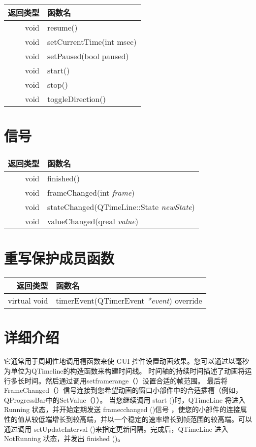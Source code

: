 \begin{tabular}{|r|l|}
	\hline
	返回类型 &	函数名 \\ 
	\hline
	void  &	resume() \\ 
	\hline
	void &	setCurrentTime(int msec) \\ 
	\hline
	void &	setPaused(bool paused) \\ 
	\hline
	void 	&start() \\ 
	\hline
	void &	stop() \\ 
	\hline
	void &	toggleDirection() \\ 
	\hline
\end{tabular}




\section{信号}

\begin{tabular}{|r|l|}
	\hline
	返回类型 &	函数名 \\ 
	\hline
	void  &	finished() \\ 
	\hline
	void 	&frameChanged(int \emph{frame}) \\ 
	\hline
	void 	&stateChanged(QTimeLine::State \emph{newState}) \\ 
	\hline 
	void 	&valueChanged(qreal \emph{value}) \\
	\hline
\end{tabular}

\section{重写保护成员函数}

\begin{tabular}{|r|l|}
	\hline
	返回类型 &	函数名 \\ 
	\hline
	virtual void &	timerEvent(QTimerEvent \emph{*event}) override\\ 
	\hline
\end{tabular}

\section{详细介绍}

它通常用于周期性地调用槽函数来使 GUI 控件设置动画效果。您可以通过以毫秒为单位为QTimeline的构造函数来构建时间线。
时间轴的持续时间描述了动画将运行多长时间。然后通过调用setframerange（）设置合适的帧范围。
最后将FrameChanged（）信号连接到您希望动画的窗口小部件中的合适插槽（例如，QProgressBar中的SetValue（））。
当您继续调用 start ()时，QTimeLine 将进入 Running 状态，并开始定期发送 framecchanged ()信号 ，使您的小部件的连接属性的值从较低端增长到较高端，并以一个稳定的速率增长到帧范围的较高端。可以通过调用 setUpdateInterval ()来指定更新间隔。完成后，QTimeLine 进入 NotRunning 状态，并发出 finished ()。

